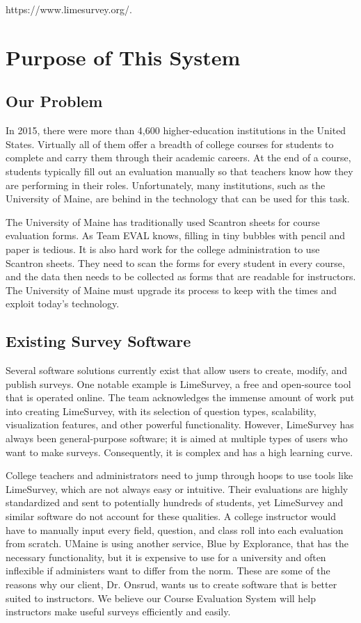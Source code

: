 \documentclass{article}
\begin{document}
https://www.limesurvey.org/.

\section{Purpose of This System}

\subsection{Our Problem}

In 2015, there were more than 4,600 higher-education institutions in the United States. Virtually all of them offer a breadth of college courses for students to complete and carry them through their academic careers. At the end of a course, students typically fill out an evaluation manually so that teachers know how they are performing in their roles. Unfortunately, many institutions, such as the University of Maine, are behind in the technology that can be used for this task.

The University of Maine has traditionally used Scantron sheets for course evaluation forms. As Team EVAL knows, filling in tiny bubbles with pencil and paper is tedious. It is also hard work for the college administration to use Scantron sheets. They need to scan the forms for every student in every course, and the data then needs to be collected as forms that are readable for instructors. The University of Maine must upgrade its process to keep with the times and exploit today's technology.

\subsection{Existing Survey Software}

Several software solutions currently exist that allow users to create, modify, and publish surveys. One notable example is LimeSurvey, a free and open-source tool that is operated online. The team acknowledges the immense amount of work put into creating LimeSurvey, with its selection of question types, scalability, visualization features, and other powerful functionality. However, LimeSurvey has always been general-purpose software; it is aimed at multiple types of users who want to make surveys. Consequently, it is complex and has a high learning curve.

College teachers and administrators need to jump through hoops to use tools like LimeSurvey, which are not always easy or intuitive. Their evaluations are highly standardized and sent to potentially hundreds of students, yet LimeSurvey and similar software do not account for these qualities. A college instructor would have to manually input every field, question, and class roll into each evaluation from scratch. UMaine is using another service, Blue by Explorance, that has the necessary functionality, but it is expensive to use for a university and often inflexible if administers want to differ from the norm. These are some of the reasons why our client, Dr. Onsrud, wants us to create software that is better suited to instructors. We believe our Course Evaluation System will help instructors make useful surveys efficiently and easily. 
\end{document}
